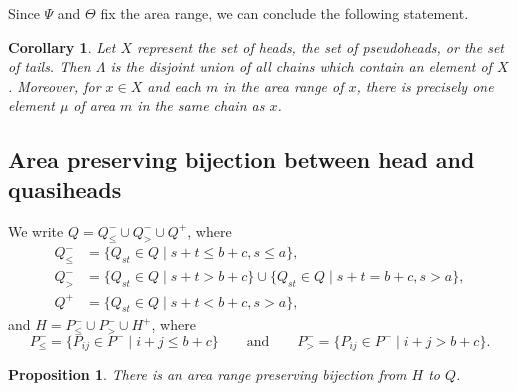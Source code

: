 \documentclass[11pt,reqno]{amsart}
\newcommand{\mms}{_}
\newtheorem{corollary}[theorem]{Corollary}
\newtheorem{proposition}[theorem]{Proposition}
\theoremstyle{definition}
\numberwithin{equation}{section}
\begin{document}
Since $\Psi$ and $\Theta$ fix the area range, we can conclude the following statement.

\begin{corollary}
\label{corollary.cover}
Let $X$ represent the set of heads, the set of pseudoheads, or the set of tails. Then $\Lambda$ is the disjoint union 
of all chains which contain an element of $X$.  
Moreover, for $x \in X$ and each $m$ in the area range of $x$, there is precisely one element $\mu$ of area $m$ in 
the same chain as $x$.
\end{corollary}

\subsection{Area preserving bijection between head and quasiheads}
\label{section.quasi}

We write $Q=Q_{\leqslant}^- \cup Q_>^- \cup Q^+$, where 
\begin{align*}
	Q_{\leqslant}^- &= \{Q\mms{st} \in Q\mid s+t \leqslant b+c, s \leqslant a\},\\
	Q_{>}^- &= \{Q\mms{st} \in Q\mid s+t > b+c\} \cup \{Q\mms{st} \in Q\mid s+t = b+c, s>a\},\\
	Q^+ &= \{Q\mms{st} \in Q\mid s+t < b+c, s > a\},
\end{align*}
and $H=P_{\leqslant}^- \cup P_>^- \cup H^+$, where
\[
	P_{\leqslant}^-=\{P_{ij} \in P^-\mid i+j \leqslant b+c\} \qquad \text{and} \qquad
	P_{>}^-=\{P_{ij} \in P^-\mid i+j > b+c\}.
\]

\begin{proposition}
\label{proposition:H-Q}
There is an area range preserving bijection from $H$ to $Q$.
\end{proposition}
\end{document}
